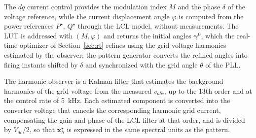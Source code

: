 \documentclass[conference]{IEEEtran}
\newcommand{\gv}{\boldsymbol{\gamma}}
\begin{document}

The $dq$ current control provides the modulation index $M$ and the phase
$\delta$ of the voltage reference, while the current displacement angle
$\varphi$ is computed
from the power references $P^\star$, $Q^\star$ through the LCL model, without
measurements. The LUT is addressed with $(M,\varphi)$ and returns the initial
angles $\gv^0$, which the real-time optimizer of Section~\ref{sec:rt} refines
using the grid voltage harmonics estimated by the observer; the pattern
generator converts the refined angles into firing instants shifted by
$\delta$ and synchronized with the grid angle $\theta$ of the PLL.

The harmonic observer is a Kalman filter \cite{kalman_filter} that
estimates the background harmonics of the grid voltage from the measured
$v_{abc}$, up to the 13th order and at the control rate of 5~kHz. Each
estimated component is converted into the converter voltage that cancels the
corresponding harmonic grid current, compensating the gain and phase of the
LCL filter at that order, and is divided by $V_{dc}/2$, so that
$\mathbf{x}^\star_h$ is expressed in the same spectral units as the
pattern.
\end{document}
